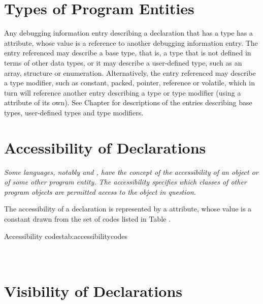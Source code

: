 \section{Types of Program Entities}
\label{chap:typesofprogramentities}
\hypertarget{chap:DWATtypetypeofdeclaration}{}
Any debugging information entry describing a declaration that
has a type has
a \DWATtypeDEFN{} attribute, whose value is a
reference to another debugging information entry. The entry
referenced may describe a base type, that is, a type that is
not defined in terms of other data types, or it may describe a
user-defined type, such as an array, structure or enumeration.
Alternatively, the entry referenced may describe a type
modifier, such as constant, packed, pointer, reference or
volatile, which in turn will reference another entry describing
a type or type modifier (using a
\DWATtypeNAME{} attribute of its
own). See Chapter 
for descriptions of the entries describing
base types, user-defined types and type modifiers.


\section{Accessibility of Declarations}
\label{chap:accessibilityofdeclarations}
\textit{Some languages, notably  and
, have the concept of
the accessibility of an object or of some other program
entity. The accessibility specifies which classes of other
program objects are permitted access to the object in question.}

The accessibility of a declaration
is\hypertarget{chap:DWATaccessibilityattribute}{}
represented by a
\DWATaccessibilityDEFN{}
attribute, whose value is a constant drawn from the set of codes
listed in Table .

\begin{simplenametable}[1.9in]{Accessibility codes}{tab:accessibilitycodes}
\DWACCESSpublicTARG{}          \\
\DWACCESSprivateTARG{}        \\
\DWACCESSprotectedTARG{}    \\
\end{simplenametable}

\section{Visibility of Declarations}
\label{chap:visibilityofdeclarations}

